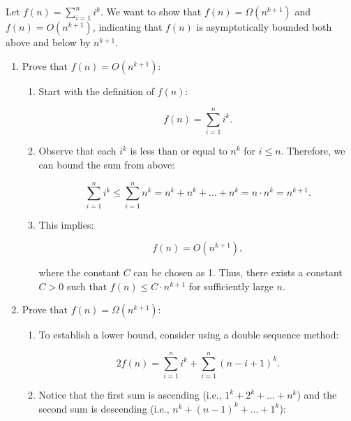     \begin{example}
        Let \( f(n) = \sum_{i=1}^n i^k \). We want to show that \( f(n) = \Omega(n^{k+1}) \) and \( f(n) = O(n^{k+1}) \), indicating that \( f(n) \) is asymptotically bounded both above and below by \( n^{k+1} \).

        \begin{enumerate}

            \item Prove that \( f(n) = O(n^{k+1}) \):
            
            \begin{enumerate}
                \item Start with the definition of \( f(n) \):
                
                \[
                f(n) = \sum_{i=1}^n i^k.
                \]
                
                \item Observe that each \( i^k \) is less than or equal to \( n^k \) for \( i \leq n \). Therefore, we can bound the sum from above:
                
                \[
                \sum_{i=1}^n i^k \leq \sum_{i=1}^n n^k = n^k + n^k + \ldots + n^k = n \cdot n^k = n^{k+1}.
                \]
                
                \item This implies:
                
                \[
                f(n) = O(n^{k+1}),
                \]
                
                where the constant \( C \) can be chosen as 1. Thus, there exists a constant \( C > 0 \) such that \( f(n) \leq C \cdot n^{k+1} \) for sufficiently large \( n \).
                
            \end{enumerate}

            \item Prove that \( f(n) = \Omega(n^{k+1}) \):
            
            \begin{enumerate}
                \item To establish a lower bound, consider using a double sequence method:
                
                \[
                2f(n) = \sum_{i=1}^n i^k + \sum_{i=1}^n (n-i+1)^k.
                \]
                
                \item Notice that the first sum is ascending (i.e., \( 1^k + 2^k + \ldots + n^k \)) and the second sum is descending (i.e., \( n^k + (n-1)^k + \ldots + 1^k \)):
                

\end{enumerate}
\end{enumerate}
\end{example}
